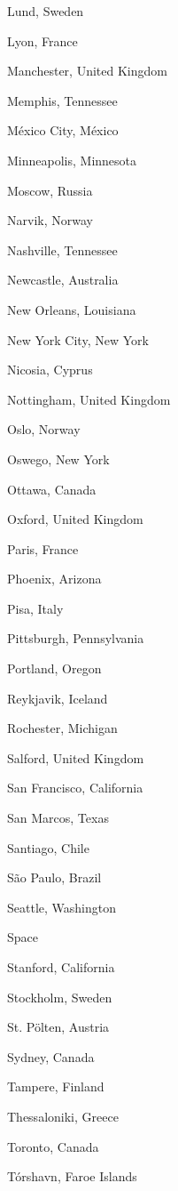 \documentclass[20pt,landscape]{foils}
\begin{document}
\begin{list1}
\begin{list2}
  \item Lund, Sweden
  \item Lyon, France
  \item Manchester, United Kingdom
  \item Memphis, Tennessee
  \item México City, México
  \item Minneapolis, Minnesota
  \item Moscow, Russia
  \item Narvik, Norway
  \item Nashville, Tennessee
  \item Newcastle, Australia
  \item New Orleans, Louisiana
  \item New York City, New York
  \item Nicosia, Cyprus
  \item Nottingham, United Kingdom
  \item Oslo, Norway
  \item Oswego, New York
  \item Ottawa, Canada
  \item Oxford, United Kingdom
  \item Paris, France
  \item Phoenix, Arizona
  \item Pisa, Italy
  \item Pittsburgh, Pennsylvania
  \item Portland, Oregon
  \item Reykjavik, Iceland
  \item Rochester, Michigan
  \item Salford, United Kingdom
  \item San Francisco, California
  \item San Marcos, Texas
  \item Santiago, Chile
  \item São Paulo, Brazil
  \item Seattle, Washington
  \item Space
  \item Stanford, California
  \item Stockholm, Sweden
  \item St. Pölten, Austria
  \item Sydney, Canada
  \item Tampere, Finland
  \item Thessaloniki, Greece
  \item Toronto, Canada
  \item Tórshavn, Faroe Islands

\end{list2}
\end{list1}
\end{document}
